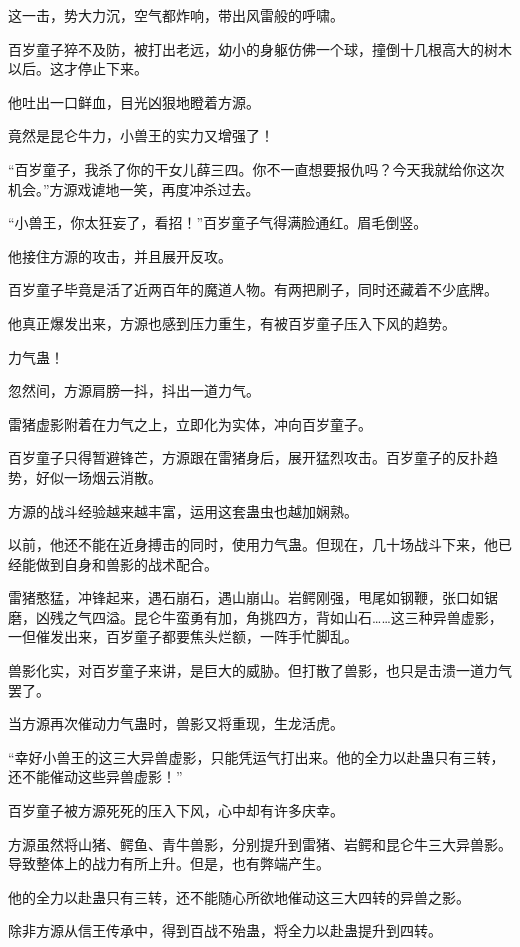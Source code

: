 \begin{this_body}
这一击，势大力沉，空气都炸响，带出风雷般的呼啸。

百岁童子猝不及防，被打出老远，幼小的身躯仿佛一个球，撞倒十几根高大的树木以后。这才停止下来。

他吐出一口鲜血，目光凶狠地瞪着方源。

竟然是昆仑牛力，小兽王的实力又增强了！

“百岁童子，我杀了你的干女儿薛三四。你不一直想要报仇吗？今天我就给你这次机会。”方源戏谑地一笑，再度冲杀过去。

“小兽王，你太狂妄了，看招！”百岁童子气得满脸通红。眉毛倒竖。

他接住方源的攻击，并且展开反攻。

百岁童子毕竟是活了近两百年的魔道人物。有两把刷子，同时还藏着不少底牌。

他真正爆发出来，方源也感到压力重生，有被百岁童子压入下风的趋势。

力气蛊！

忽然间，方源肩膀一抖，抖出一道力气。

雷猪虚影附着在力气之上，立即化为实体，冲向百岁童子。

百岁童子只得暂避锋芒，方源跟在雷猪身后，展开猛烈攻击。百岁童子的反扑趋势，好似一场烟云消散。

方源的战斗经验越来越丰富，运用这套蛊虫也越加娴熟。

以前，他还不能在近身搏击的同时，使用力气蛊。但现在，几十场战斗下来，他已经能做到自身和兽影的战术配合。

雷猪憨猛，冲锋起来，遇石崩石，遇山崩山。岩鳄刚强，甩尾如钢鞭，张口如锯磨，凶残之气四溢。昆仑牛蛮勇有加，角挑四方，背如山石……这三种异兽虚影，一但催发出来，百岁童子都要焦头烂额，一阵手忙脚乱。

兽影化实，对百岁童子来讲，是巨大的威胁。但打散了兽影，也只是击溃一道力气罢了。

当方源再次催动力气蛊时，兽影又将重现，生龙活虎。

“幸好小兽王的这三大异兽虚影，只能凭运气打出来。他的全力以赴蛊只有三转，还不能催动这些异兽虚影！”

百岁童子被方源死死的压入下风，心中却有许多庆幸。

方源虽然将山猪、鳄鱼、青牛兽影，分别提升到雷猪、岩鳄和昆仑牛三大异兽影。导致整体上的战力有所上升。但是，也有弊端产生。

他的全力以赴蛊只有三转，还不能随心所欲地催动这三大四转的异兽之影。

除非方源从信王传承中，得到百战不殆蛊，将全力以赴蛊提升到四转。


\end{this_body}
